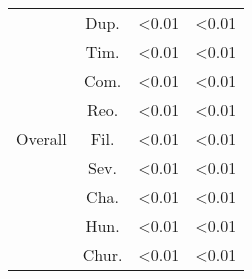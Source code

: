 \begin{table}[]
\begin{tabular}{cccc}
          & Dup.   & \textless0.01         & \textless0.01         \\  \rowcolor{gray!25}
          & Tim.   & \textless0.01         & \textless0.01         \\  \rowcolor{gray!25}
          & Com.   & \textless0.01         & \textless0.01         \\  \rowcolor{gray!25}
          & Reo.   & \textless0.01         & \textless0.01         \\  \rowcolor{gray!25}
Overall   & Fil.   & \textless0.01         & \textless0.01         \\  \rowcolor{gray!25}
          & Sev.   & \textless0.01         & \textless0.01         \\  \rowcolor{gray!25}
          & Cha.   & \textless0.01         & \textless0.01         \\  \rowcolor{gray!25}
          & Hun.   & \textless0.01         & \textless0.01         \\  \rowcolor{gray!25}
          & Chur.  & \textless0.01         & \textless0.01
\end{tabular}
\end{table}
